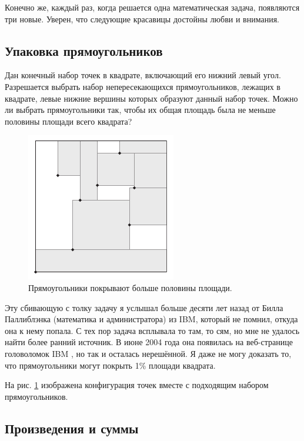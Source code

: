 \medskip

Конечно же, каждый раз, когда решается одна математическая задача, появляются три новые.
Уверен, что следующие красавицы достойны любви и внимания.

\subsection*{Упаковка прямоугольников}

Дан конечный набор точек в квадрате, включающий его нижний левый угол.
Разрешается выбрать набор непересекающихся прямоугольников, лежащих в квадрате, левые нижние вершины которых образуют данный набор точек.
Можно ли выбрать прямоугольники так, чтобы их общая площадь была не меньше половины площади всего квадрата?

\begin{figure}[hbt!]
\centering
\includegraphics[scale=1]{pics/square}
\caption{Прямоугольники покрывают больше половины площади.}
\label{pic:square}
\end{figure}

\medskip

Эту сбивающую с толку задачу я услышал больше десяти лет назад от Билла Паллиблэнка (математика и администратора) из IBM, который не помнил, откуда она к нему попала.
С тех пор задача всплывала то там, то сям, но мне не удалось найти более ранний источник.
В июне 2004 года она появилась на веб-странице головоломок IBM \cite{ponder-this}, но так и осталась нерешённой.
Я даже не могу доказать то, что прямоугольники могут покрыть 1\% площади квадрата.

На рис. \ref{pic:square} изображена конфигурация точек вместе с подходящим набором прямоугольников.

\subsection*{Произведения и суммы}


